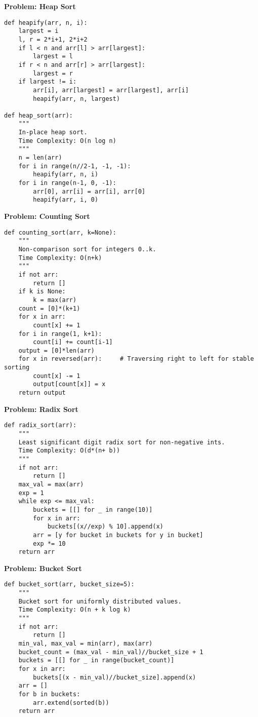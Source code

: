 \noindent\textbf{Problem: Heap Sort}
\begin{verbatim}
def heapify(arr, n, i):
    largest = i
    l, r = 2*i+1, 2*i+2
    if l < n and arr[l] > arr[largest]:
        largest = l
    if r < n and arr[r] > arr[largest]:
        largest = r
    if largest != i:
        arr[i], arr[largest] = arr[largest], arr[i]
        heapify(arr, n, largest)

def heap_sort(arr):
    """
    In-place heap sort.
    Time Complexity: O(n log n)
    """
    n = len(arr)
    for i in range(n//2-1, -1, -1):
        heapify(arr, n, i)
    for i in range(n-1, 0, -1):
        arr[0], arr[i] = arr[i], arr[0]
        heapify(arr, i, 0)
\end{verbatim}

\noindent\textbf{Problem: Counting Sort}
\begin{verbatim}
def counting_sort(arr, k=None):
    """
    Non-comparison sort for integers 0..k.
    Time Complexity: O(n+k)
    """
    if not arr:
        return []
    if k is None:
        k = max(arr)
    count = [0]*(k+1)
    for x in arr:
        count[x] += 1
    for i in range(1, k+1):
        count[i] += count[i-1]
    output = [0]*len(arr)
    for x in reversed(arr):     # Traversing right to left for stable sorting
        count[x] -= 1
        output[count[x]] = x
    return output
\end{verbatim}

\noindent\textbf{Problem: Radix Sort}
\begin{verbatim}
def radix_sort(arr):
    """
    Least significant digit radix sort for non-negative ints.
    Time Complexity: O(d*(n+ b))
    """
    if not arr:
        return []
    max_val = max(arr)
    exp = 1
    while exp <= max_val:
        buckets = [[] for _ in range(10)]
        for x in arr:
            buckets[(x//exp) % 10].append(x)
        arr = [y for bucket in buckets for y in bucket]
        exp *= 10
    return arr
\end{verbatim}

\noindent\textbf{Problem: Bucket Sort}
\begin{verbatim}
def bucket_sort(arr, bucket_size=5):
    """
    Bucket sort for uniformly distributed values.
    Time Complexity: O(n + k log k)
    """
    if not arr:
        return []
    min_val, max_val = min(arr), max(arr)
    bucket_count = (max_val - min_val)//bucket_size + 1
    buckets = [[] for _ in range(bucket_count)]
    for x in arr:
        buckets[(x - min_val)//bucket_size].append(x)
    arr = []
    for b in buckets:
        arr.extend(sorted(b))
    return arr
\end{verbatim}

